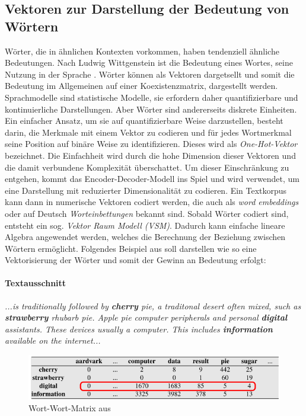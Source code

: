 \documentclass[
        ngerman,
        paper=a4,
        numbers=noendperiod,
]{scrreprt}
\begin{document}
\subsection{Vektoren zur Darstellung der Bedeutung von Wörtern}
Wörter, die in ähnlichen Kontexten vorkommen, haben tendenziell ähnliche Bedeutungen. Nach Ludwig Wittgenstein ist die Bedeutung eines Wortes, seine Nutzung in der Sprache \citep{wittgenstein2009philosophical}. Wörter können als Vektoren dargetsellt und somit die Bedeutung im Allgemeinen auf einer Koexistenzmatrix, dargestellt werden. Sprachmodelle sind statistische Modelle, sie erfordern daher quantifizierbare und kontinuierliche Darstellungen. Aber Wörter sind andererseits diskrete Einheiten. Ein einfacher Ansatz, um sie auf quantifizierbare Weise darzustellen, besteht darin, die Merkmale mit einem Vektor zu codieren und für jedes Wortmerkmal seine Position auf binäre Weise zu identifizieren. Dieses wird als \textit{One-Hot-Vektor} bezeichnet. Die Einfachheit wird durch die hohe Dimension dieser Vektoren und die damit verbundene Komplexität überschattet. Um dieser Einschränkung zu entgehen, kommt das Encoder-Decoder-Modell ins Spiel und wird verwendet, um eine Darstellung mit reduzierter Dimensionalität zu codieren. Ein Textkorpus kann dann in numerische Vektoren codiert werden, die auch als \textit{word embeddings} oder auf Deutsch \textit{Worteinbettungen} bekannt sind. Sobald Wörter codiert sind, entsteht ein sog. \textit{Vektor Raum Modell (VSM)}. Dadurch kann einfache lineare Algebra angewendet werden, welches die Berechnung der Beziehung zwischen Wörtern ermöglicht. Folgendes Beispiel aus \citep[S. 105]{Jurafsky2014SpeechProcessing} soll darstellen wie so eine Vektorisierung der Wörter und somit der Gewinn an Bedeutung erfolgt:

 \paragraph{Textausschnitt}
 \textit{...is traditionally followed by \textbf{cherry} pie, a traditonal desert often mixed, such as \textbf{strawberry} rhubarb pie. Apple pie computer peripherals and personal \textbf{digital} assistants. These devices usually a computer. This includes \textbf{information} available on the internet...}




    
\begin{figure}[H]
    \centering\includegraphics[width=0.6\linewidth]{images/mat.png}
    \caption[Wort-Wort-Matrix]{Wort-Wort-Matrix aus \citep[S. 105]{Jurafsky2014SpeechProcessing}}
    \label{fig:mat}
\end{figure}
\end{document}
